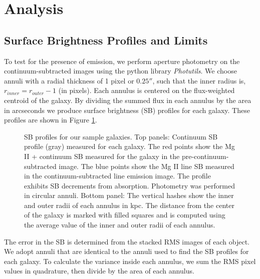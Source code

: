 \documentclass[twocolumn]{aastex62}
\begin{document}
\section{Analysis} \label{sec:analysis}

\subsection{Surface Brightness Profiles and Limits}\label{sec.sb}
To test for the presence of  emission, we perform aperture photometry on the continuum-subtracted images using the python library \emph{Photutils}. We choose annuli with a radial thickness of 1 pixel or $0.25 ''$, such that the inner radius is, $r_{inner}=r_{outer}-1$ (in pixels). Each annulus is centered on the flux-weighted centroid of the galaxy. By dividing the summed flux in each annulus by the area in arcseconds we produce surface brightness (SB) profiles for each galaxy. These profiles are shown in Figure \ref{fig:sb_profiles}. 

\begin{figure}
\centering
{}
\caption{SB profiles for our sample galaxies. Top panels: Continuum SB profile (gray) measured for each galaxy. The red points show the Mg II + continuum SB measured for the galaxy in the pre-continuum-subtracted image. The blue points show the Mg II line SB measured  in the continuum-subtracted line emission image.  The profile exhibits SB decrements from  absorption. Photometry was performed in circular annuli. Bottom panel: The vertical hashes show the inner and outer radii of each annulus in kpc. The distance from the center of the galaxy is marked with filled squares and is computed using the average value of the inner and outer radii of each annulus.}
\label{fig:sb_profiles}
\end{figure}

The error in the SB is determined from the stacked RMS images of each object.  We adopt annuli that are identical to the annuli used to find the SB profiles for each galaxy. To calculate the variance inside each annulus, we sum the RMS pixel values in quadrature, then divide by the area of each annulus. 
\end{document}
